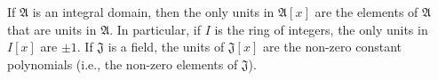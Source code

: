 If $\mathfrak{A}$ is an integral domain, then the only units in $\mathfrak{A}[x]$ are the elements of $\mathfrak{A}$ that are units in $\mathfrak{A}$. In particular, if $I$ is the ring of integers, the only units in $I[x]$ are $\pm 1$. If $\mathfrak{J}$ is a field, the units of $\mathfrak{J}[x]$ are the non-zero constant polynomials (i.e., the non-zero elements of $\mathfrak{J}$).
